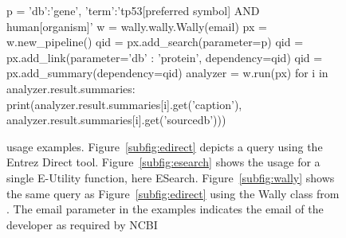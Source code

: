 \begin{figure}
\begin{lrbox}{\mylistingbox}
\begin{minipage}{\linewidth}
\begin{python}
p = {'db':'gene', 'term':'tp53[preferred symbol] AND human[organism]'}
w = wally.wally.Wally(email)
px = w.new_pipeline()
qid = px.add_search(parameter=p)
qid = px.add_link(parameter={'db' : 'protein'}, dependency=qid)
qid = px.add_summary(dependency=qid)
analyzer = w.run(px)
for i in analyzer.result.summaries:
  print(analyzer.result.summaries[i].get('caption'),
        analyzer.result.summaries[i].get('sourcedb')))
\end{python}%
    \end{minipage}%
  \end{lrbox}%
  \caption{\entrezpy usage examples. Figure~\ref{subfig:edirect} depicts a query
           using the Entrez Direct tool. Figure~\ref{subfig:esearch} shows
           the usage for a single E-Utility function, here ESearch.
           Figure~\ref{subfig:wally} shows the same query as
           Figure~\ref{subfig:edirect} using the Wally class from \entrezpy. The
           email parameter in the \entrezpy examples indicates the email of the
           developer as required by NCBI
  \label{fig:entrezpy_examples}}
\end{figure}
